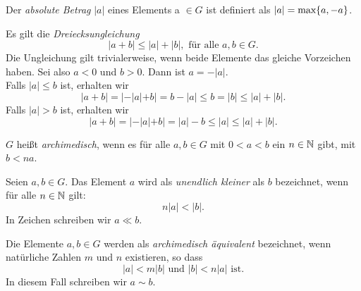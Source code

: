 \begin{defn} \label{betrag}
Der \textit{absolute Betrag} $|a|$ eines Elements a $\in  G$ ist definiert als $|a| = \textup{max}\lbrace a, -a \rbrace$.
\end{defn}

Es gilt die \textit{Dreiecksungleichung}
\[|a+ b | \le |a| + |b|, \text{ für alle } a, b \in G.\]
Die Ungleichung gilt trivialerweise, wenn beide Elemente das gleiche Vorzeichen haben. Sei also $a < 0$ und $b > 0$. Dann ist $a= -|a|$.\\
Falls $|a|\le b$ ist, erhalten wir
\[ |a + b |= |-|a|+b| = b - |a| \le b = |b|\le|a| + |b|. \]
Falls $|a| >b$ ist, erhalten wir 
\[|a+b| = |-|a| +b| = |a| - b \le |a|\le |a| + |b|.\]  
%
% 
%
%
%
%
%
\begin{defn}\label{archim}
$G$ heißt \textit{archimedisch}, wenn es für alle $a, b \in G$  mit $0 < a < b$ ein $n \in \mathbb{N} $ gibt, mit $b < na$.
\end{defn}
%
%
\begin{defn}\label{uek}
Seien $a, b \in G$. Das Element $a$ wird als \textit{unendlich kleiner} als $b$ bezeichnet, wenn für alle $  n \in \mathbb{N} $ gilt: 
\[n|a| < |b|.\]
In Zeichen schreiben wir $a \ll b$.
\end{defn}
%
\begin{defn}\label{aae}
Die Elemente $a,b \in G$ werden als \textit{archimedisch äquivalent} bezeichnet, wenn natürliche Zahlen $m$ und $n$ existieren, so dass 
\[|a| < m|b| \text{ und } |b| < n|a|\text{ ist}.\]
In diesem Fall schreiben wir $ a \sim b $. 
\end{defn}
%
